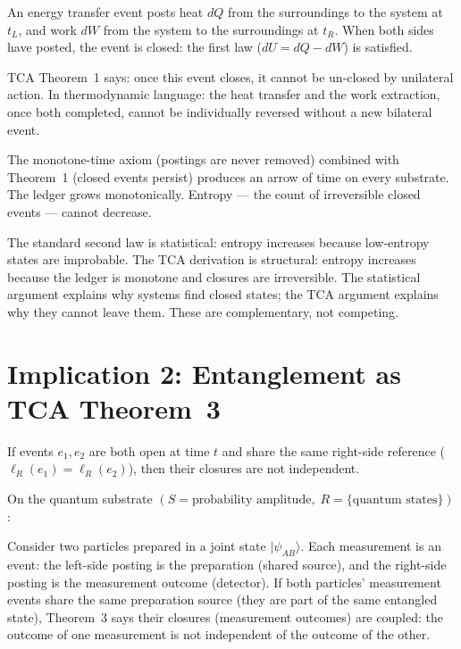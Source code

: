 \documentclass[11pt]{article}
\begin{document}
An energy transfer event posts heat $dQ$ from the surroundings to
the system at $t_L$, and work $dW$ from the system to the surroundings
at $t_R$. When both sides have posted, the event is closed: the
first law ($dU = dQ - dW$) is satisfied.

TCA Theorem~1 says: once this event closes, it cannot be un-closed
by unilateral action. In thermodynamic language: the heat transfer
and the work extraction, once both completed, cannot be individually
reversed without a new bilateral event.

\begin{corollary}
The monotone-time axiom (postings are never removed) combined with
Theorem~1 (closed events persist) produces an arrow of time on
every substrate. The ledger grows monotonically. Entropy --- the
count of irreversible closed events --- cannot decrease.
\end{corollary}

\begin{remark}
The standard second law is statistical: entropy increases because
low-entropy states are improbable. The TCA derivation is structural:
entropy increases because the ledger is monotone and closures are
irreversible. The statistical argument explains why systems find
closed states; the TCA argument explains why they cannot leave them.
These are complementary, not competing.
\end{remark}

\section{Implication 2: Entanglement as TCA Theorem~3}

\begin{theorem}
If events $e_1, e_2$ are both open at time $t$ and share the same
right-side reference ($\ell_R(e_1) = \ell_R(e_2)$), then their
closures are not independent.
\end{theorem}

On the quantum substrate $(S = \text{probability amplitude},\;
R = \{\text{quantum states}\})$:

Consider two particles prepared in a joint state $|\psi_{AB}\rangle$.
Each measurement is an event: the left-side posting is the
preparation (shared source), and the right-side posting is the
measurement outcome (detector). If both particles' measurement
events share the same preparation source (they are part of the same
entangled state), Theorem~3 says their closures (measurement
outcomes) are coupled: the outcome of one measurement is not
independent of the outcome of the other.
\end{document}

